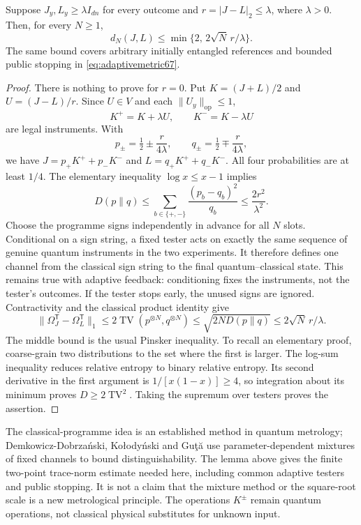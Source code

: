 \begin{lemma}\label{lem:programme67}
Suppose $J_y,L_y\ge\lambda I_{dn}$ for every outcome and
$r=|J-L|_2\le\lambda$, where $\lambda>0$. Then, for every $N\ge1$,
\begin{equation}\label{eq:rootN67}
 d_N(J,L)\le\min\{2,\,2\sqrt N\,r/\lambda\}.
\end{equation}
The same bound covers arbitrary initially entangled references and
bounded public stopping in \eqref{eq:adaptivemetric67}.
\end{lemma}
\begin{proof}
There is nothing to prove for $r=0$. Put $K=(J+L)/2$ and
$U=(J-L)/r$. Since $U\in V$ and each $\|U_y\|_{\mathrm{op}}\le1$,
\[
                      K^+=K+\lambda U,\qquad K^-=K-\lambda U
\]
are legal instruments. With
\[
 p_\pm=\tfrac12\pm\frac r{4\lambda},\qquad
 q_\pm=\tfrac12\mp\frac r{4\lambda},
\]
we have $J=p_+K^++p_-K^-$ and $L=q_+K^++q_-K^-$.
All four probabilities are at least $1/4$. The elementary inequality
$\log x\le x-1$ implies
\[
 D(p\|q)\le\sum_{b\in\{+,-\}}\frac{(p_b-q_b)^2}{q_b}
                                      \le\frac{2r^2}{\lambda^2}.
\]
Choose the programme signs independently in advance for all $N$
slots. Conditional on a sign string, a fixed tester acts on exactly
the same sequence of genuine quantum instruments in the two
experiments. It therefore defines one channel from the classical sign
string to the final quantum--classical state. This remains true with
adaptive feedback: conditioning fixes the instruments, not the
tester's outcomes. If the tester stops early, the unused signs are
ignored. Contractivity and the classical product identity give
\[
 \|\Omega_J^{\mathsf T}-\Omega_L^{\mathsf T}\|_1
 \le2\operatorname{TV}(p^{\otimes N},q^{\otimes N})
 \le\sqrt{2N D(p\|q)}\le2\sqrt N\,r/\lambda.
\]
The middle bound is the usual Pinsker inequality. To recall an elementary
proof, coarse-grain two distributions to the set where the first is
larger. The log-sum inequality reduces relative entropy to binary
relative entropy. Its second derivative in the first argument is
$1/[x(1-x)]\ge4$, so integration about its minimum proves
$D\ge2\operatorname{TV}^2$. Taking the supremum over testers proves
the assertion.
\end{proof}
The classical-programme idea is an established method in quantum
metrology; Demkowicz-Dobrza\'nski, Ko\l ody\'nski and Gu\c{t}\u{a}
\cite[Equations~(4)--(6), Methods]{DKG67} use parameter-dependent
mixtures of fixed channels to bound distinguishability. The lemma
above gives the finite two-point trace-norm estimate needed here,
including common adaptive testers and public stopping. It is not a
claim that the mixture method or the square-root scale is a new
metrological principle. The operations $K^\pm$ remain quantum
operations, not classical physical substitutes for unknown input.

